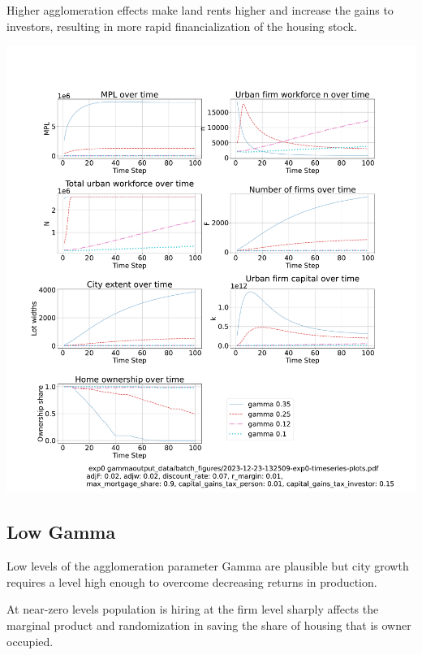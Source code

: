 Higher agglomeration effects make land rents higher and increase the gains to investors, resulting in more rapid financialization of the housing stock.

 

 \hspace*{-2.5cm}\includegraphics[trim= 1.5cm 3.65cm 2cm 4.0cm, clip, scale=.28]{fig/Analysis/Gamma-5-30.pdf}

\newpage %

\subsection{Low Gamma}
Low levels of the agglomeration parameter Gamma are plausible but city growth requires a level high enough to overcome decreasing returns in production.

At near-zero levels population is hiring at the firm level sharply affects  the marginal product and randomization in saving the share of housing that is owner occupied.
 
